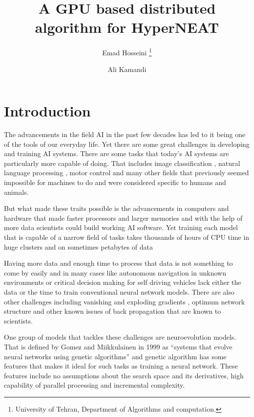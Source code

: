 \documentclass[twocolumn]{article}
\title{A GPU based distributed algorithm for HyperNEAT}
\author{Emad Hosseini \thanks{University of Tehran, 
Department of Algorithms and computation.} 
\and Ali Kamandi}
\begin{document}
\maketitle


\section{Introduction}
The advancements in the field AI in the past few decades
has led to it being one of the tools of our everyday
life. Yet there are some great challenges in developing
and training AI systems. There are some tasks that
today's AI systems are particularly more capable of
doing. That includes image classification 
\cite{DeepImageClassificationReview}, natural
language processing \cite{NLPReview}, motor control
\cite{DeepRlforMotorControl} and many other fields
that previously seemed impossible for machines to do
and were considered specific to humans and animals.

But what made these traits possible is the advancements
in computers and hardware that made faster processors and
larger memories and with the help of more data scientists
could build working AI software. Yet training each model
that is capable of a narrow field of tasks takes 
thousands of hours of CPU time in huge clusters and on
sometimes petabytes of data \cite{NEAT-Hardware-IEEE}

Having more data and enough time to process that data is
not something to come by easily and in many cases like 
autonomous navigation in unknown environments or critical 
decision making for self driving vehicles lack either 
the data or the time to train conventional neural network 
models. There are also other challenges including
vanishing and exploding gradients 
\cite{ExplodingAndVanishingGradients}, optimum 
network structure and other known issues of back 
propagation that are known to scientists. 

One group of models that tackles these challenges are
neuroevolution models. That is defined by Gomez and 
Miikkulainen in 1999 as ``systems that evolve neural 
networks using genetic algorithms''
\cite{NEDefenitionMiikkulainen} and genetic algorithm
has some features that makes it ideal for such tasks
as training a neural network. These features include
no assumptions about the search space and its 
derivatives, high capability of parallel processing
and incremental complexity.
\end{document}
